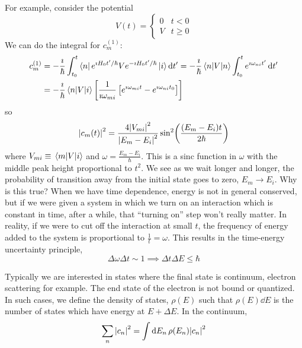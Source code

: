 \documentclass[a4paper,twoside,master.tex]{subfiles}
\begin{document}
\begin{ex}
    For example, consider the potential
    \begin{equation}
        V(t) = \begin{cases} 0 & t < 0 \\ V & t \geq 0 \end{cases}
    \end{equation}
    We can do the integral for $ c_m^{(1)} $:
    \begin{align}
        c_m^{(1)} &= - \frac{\imath}{\hbar} \int_{t_0}^t\bra{n} e^{\imath H_0 t'/ \hbar} V e^{- \imath H_0 t'/ \hbar}\ket{i} \dd{t'} = - \frac{\imath}{\hbar} \mel{n}{V}{n} \int_{t_0}^t e^{\imath \omega_{ni} t'} \dd{t'} \\
        &= - \frac{\imath}{\hbar} \mel{n}{V}{i} \left[ \frac{1}{\imath \omega_{mi}} \left[ e^{\imath \omega_{mi} t} - e^{\imath \omega_{ni} t_0} \right] \right]
    \end{align}
    so
    \begin{equation}
        \abs{c_m(t)}^2 = \frac{4 \abs{V_{mi}}^2}{\abs{E_m - E_i}^2} \sin[2](\frac{(E_m - E_i)t}{2 \hbar})
    \end{equation}
    where $ V_{mi} \equiv \mel{m}{V}{i} $ and $ \omega = \frac{E_m - E_i}{\hbar} $. This is a sinc function in $ \omega $ with the middle peak height proportional to $ t^2 $. We see as we wait longer and longer, the probability of transition away from the initial state goes to zero, $ E_m \to E_i $. Why is this true? When we have time dependence, energy is not in general conserved, but if we were given a system in which we turn on an interaction which is constant in time, after a while, that ``turning on'' step won't really matter. In reality, if we were to cut off the interaction at small $ t $, the frequency of energy added to the system is proportional to $ \frac{1}{t} = \omega $. This results in the time-energy uncertainty principle,
    \begin{equation}
        \Delta \omega \Delta t \sim 1 \implies \Delta t \Delta E \leq \hbar
    \end{equation}
\end{ex}

Typically we are interested in states where the final state is continuum, electron scattering for example. The end state of the electron is not bound or quantized. In such cases, we define the density of states, $ \rho(E) $ such that $ \rho(E) \dd{E} $ is the number of states which have energy at $ E + \Delta E $. In the continuum,
\begin{equation}
    \sum_n \abs{c_n}^2 = \int \dd{E_n} \rho(E_n) \abs{c_n}^2
\end{equation}
\end{document}
